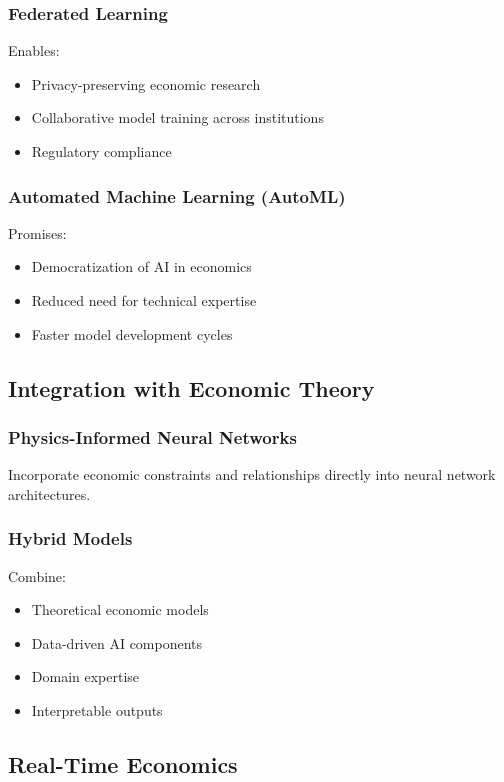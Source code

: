 \documentclass[12pt,a4paper]{article}
\begin{document}
\subsubsection{Federated Learning}
Enables:
\begin{itemize}
    \item Privacy-preserving economic research
    \item Collaborative model training across institutions
    \item Regulatory compliance
\end{itemize}

\subsubsection{Automated Machine Learning (AutoML)}
Promises:
\begin{itemize}
    \item Democratization of AI in economics
    \item Reduced need for technical expertise
    \item Faster model development cycles
\end{itemize}

\subsection{Integration with Economic Theory}

\subsubsection{Physics-Informed Neural Networks}
Incorporate economic constraints and relationships directly into neural network architectures.

\subsubsection{Hybrid Models}
Combine:
\begin{itemize}
    \item Theoretical economic models
    \item Data-driven AI components
    \item Domain expertise
    \item Interpretable outputs
\end{itemize}

\subsection{Real-Time Economics}
\end{document}
